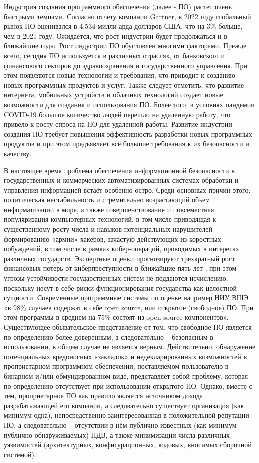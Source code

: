 
{\actuality}
Индустрия создания программного обеспечения (далее - ПО) растет очень быстрыми темпами. Согласно отчету компании Gartner, в 2022 году глобальный рынок ПО оценивался в 4.534 милли­ арда долларов США, что на 3\% больше, чем в 2021 году. Ожидается, что рост индустрии будет продолжаться и в ближайшие годы. Рост инду­стрии ПО обусловлен многими факторами. Прежде всего, сегодня ПО используется в различных отраслях, от банковского и финансового секторов до здравоохранения и государственного управления. При этом появляются новые технологии и требования, что приводит к со­зданию новых программных продуктов и услуг. Также следует отметить, что развитие интернета, мобильных устройств и облачных технологий создает новые возможности для создания и использования ПО. Более того, в условиях пандемии COVID-19 большое количество людей перешло на удаленную работу, что привело к росту спроса на ПО для удаленной работы. Развитие индустрии создания ПО требует повышения эффективность разработки новых программных продуктов и при этом предъявляет всё большие требования к их безопасности и качеству.

В настоящее время проблема обеспечения информационной безопасности в государственных и коммерческих автоматизированных системах обработки и управления информацией встаёт особенно остро. Среди основных причин этого: политическая нестабильность и стремительно возрастающий объем информатизации в мире, а также совершенствование и повсеместная популяризация компьютерных технологий, в том числе приводящая к существенному росту числа и навыков потенциальных нарушителей – формированию «армии» хакеров, зачастую действующих из коростных побуждений, в том числе в рамках кибер-операций, проводимых в интересах различных государств. Экспертные оценки прогнозируют трехкратный рост финансовых потерь от киберпреступности в ближайшие пять лет , при этом угрозы устойчивости государственных систем не поддаются исчислению, поскольку несут в себе риски функционирования государства как целостной сущности.
Современные программные системы по оценке например НИУ ВШЭ «в 98\% случаев содержат в себе open source, или открытое (свободное) ПО. При этом программы в среднем на 75\% состоят из open source компонентов». Существующее обывательское представление от том, что свободное ПО является по определению более доверенным, а следовательно – безопасным в использовании, в общем случае не является верным. Действительно, обнаружение потенциальных вредоносных «закладок» и недекларированных возможностей в проприетарном программном обеспечении, поставляемом пользователю в бинарном и/или обмундированном виде, представляет собой проблему, которая по определению отсутствует при использовании открытого ПО. Однако, вместе с тем, проприетарное ПО как правило является источником дохода разрабатывающей его компании, а следовательно существует организация (как минимум одна), непосредственно заинтересованная в положительной репутации ПО, а следовательно – отсутствии в нём публично известных (как минимум – публично-обнаруживаемых) НДВ, а также минимизации числа различных уязвимостей (архитектурных, конфигурационных, кодовых, вносимых сборочной системой).

